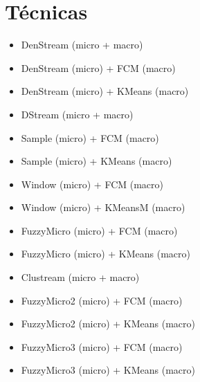 \section{Técnicas}

\begin{itemize}
    \item DenStream (micro + macro)
    \item DenStream (micro) + FCM (macro)
    \item DenStream (micro) + KMeans (macro)
    \item DStream (micro + macro)
    \item Sample (micro) + FCM (macro)
    \item Sample (micro) + KMeans (macro)
    \item Window (micro) + FCM (macro)
    \item Window (micro) + KMeansM (macro)
    \item FuzzyMicro (micro) + FCM (macro)
    \item FuzzyMicro (micro) + KMeans (macro)
\end{itemize}

\begin{itemize}
    \item Clustream (micro + macro)
    \item FuzzyMicro2 (micro) + FCM (macro)
    \item FuzzyMicro2 (micro) + KMeans (macro)
    \item FuzzyMicro3 (micro) + FCM (macro)
    \item FuzzyMicro3 (micro) + KMeans (macro)
\end{itemize}